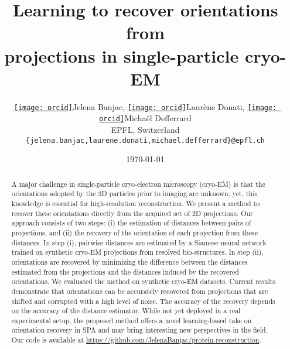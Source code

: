 \documentclass{article}
\author{
    \href{https://orcid.org/0000-0001-7373-4150}{\texttt{[image: orcid]}\hspace{1mm}}Jelena Banjac,
    \href{https://orcid.org/0000-0001-9834-7755}{\texttt{[image: orcid]}\hspace{1mm}}Laurène Donati,
    \href{https://orcid.org/0000-0002-6028-9024}{\texttt{[image: orcid]}\hspace{1mm}}Michaël Defferrard \\
    EPFL, Switzerland \\
    \texttt{\{jelena.banjac,laurene.donati,michael.defferrard\}@epfl.ch}
}
\date{\today}
\title{Learning to recover orientations from\\projections in single-particle cryo-EM}
\begin{document}
\maketitle

\begin{abstract}
    A major challenge in single-particle cryo-electron microscopy (cryo-EM) is that the orientations adopted by the 3D particles prior to imaging are unknown; yet, this knowledge is essential for high-resolution reconstruction.
    We present a method to recover these orientations directly from the acquired set of 2D projections.
    Our approach consists of two steps: (i) the estimation of distances between pairs of projections, and (ii) the recovery of the orientation of each projection from these distances.
    In step (i), pairwise distances are estimated by a Siamese neural network trained on synthetic cryo-EM projections from resolved bio-structures.
    In step (ii), orientations are recovered by minimizing the difference between the distances estimated from the projections and the distances induced by the recovered orientations.
    We evaluated the method on synthetic cryo-EM datasets.
    Current results demonstrate that orientations can be accurately recovered from projections that are shifted and corrupted with a high level of noise.
    The accuracy of the recovery depends on the accuracy of the distance estimator.
    While not yet deployed in a real experimental setup, the proposed method offers a novel learning-based take on orientation recovery in SPA and may bring interesting new perspectives in the field.
    Our code is available at \url{https://github.com/JelenaBanjac/protein-reconstruction}.
\end{abstract}

%










\appendix

\end{document}
